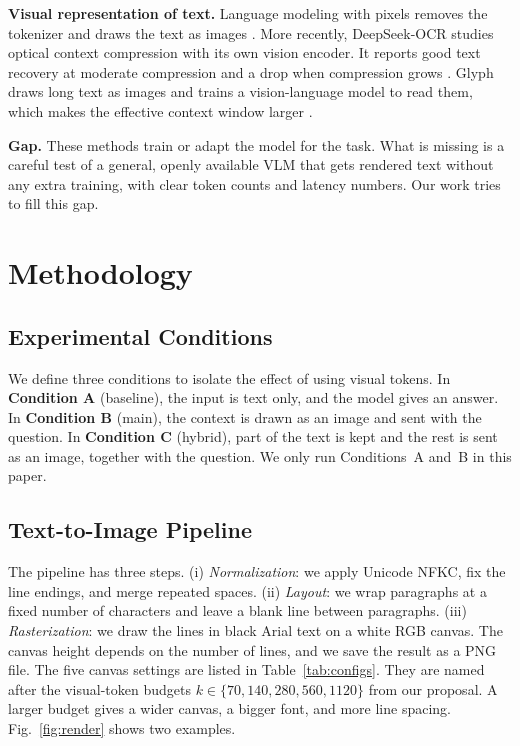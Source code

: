 \documentclass[conference]{IEEEtran}
\begin{document}
\textbf{Visual representation of text.} Language modeling with pixels removes the tokenizer and draws the text as images \cite{rust2023pixel}. More recently, DeepSeek-OCR studies optical context compression with its own vision encoder. It reports good text recovery at moderate compression and a drop when compression grows \cite{wei2025deepseekocr}. Glyph draws long text as images and trains a vision-language model to read them, which makes the effective context window larger \cite{cheng2025glyph}.

\textbf{Gap.} These methods train or adapt the model for the task. What is missing is a careful test of a general, openly available VLM that gets rendered text without any extra training, with clear token counts and latency numbers. Our work tries to fill this gap.

\section{Methodology}
\label{sec:method}

\subsection{Experimental Conditions}
We define three conditions to isolate the effect of using visual tokens. In \textbf{Condition A} (baseline), the input is text only, and the model gives an answer. In \textbf{Condition B} (main), the context is drawn as an image and sent with the question. In \textbf{Condition C} (hybrid), part of the text is kept and the rest is sent as an image, together with the question. We only run Conditions~A and~B in this paper.

\subsection{Text-to-Image Pipeline}
The pipeline has three steps. (i) \emph{Normalization}: we apply Unicode NFKC, fix the line endings, and merge repeated spaces. (ii) \emph{Layout}: we wrap paragraphs at a fixed number of characters and leave a blank line between paragraphs. (iii) \emph{Rasterization}: we draw the lines in black Arial text on a white RGB canvas. The canvas height depends on the number of lines, and we save the result as a PNG file. The five canvas settings are listed in Table~\ref{tab:configs}. They are named after the visual-token budgets $k\in\{70,140,280,560,1120\}$ from our proposal. A larger budget gives a wider canvas, a bigger font, and more line spacing. Fig.~\ref{fig:render} shows two examples.
\end{document}
